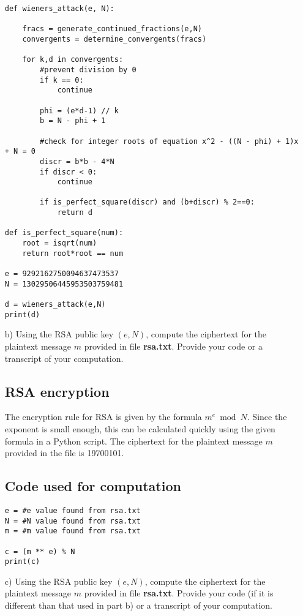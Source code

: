 \documentclass[12pt, letterpaper]{article}
\newcommand{\bgreen}[1]{\textbf{\textcolor{green!50!black}{#1}}}
\begin{document}
\begin{itemize}
\begin{lstlisting}
def wieners_attack(e, N):

    fracs = generate_continued_fractions(e,N)
    convergents = determine_convergents(fracs)

    for k,d in convergents:
        #prevent division by 0
        if k == 0:
            continue

        phi = (e*d-1) // k
        b = N - phi + 1

        #check for integer roots of equation x^2 - ((N - phi) + 1)x + N = 0
        discr = b*b - 4*N
        if discr < 0:
            continue

        if is_perfect_square(discr) and (b+discr) % 2==0:
            return d

def is_perfect_square(num):
    root = isqrt(num)
    return root*root == num

e = 9292162750094637473537
N = 13029506445953503759481

d = wieners_attack(e,N)
print(d)
\end{lstlisting}

\item[b)] Using the RSA public key $(e,N)$, compute the ciphertext for the plaintext message $m$ provided in 
file \bgreen{rsa.txt}.
Provide your code or a transcript of your computation.

\subsection{RSA encryption}
The encryption rule for RSA is given by the formula $m^{e}\bmod N$. Since the exponent is small enough, this can be calculated quickly using the
given formula in a Python script. The ciphertext for the plaintext message $m$ provided in the file is 19700101.\newpage
\subsection{Code used for computation}
\begin{lstlisting}
e = #e value found from rsa.txt
N = #N value found from rsa.txt
m = #m value found from rsa.txt

c = (m ** e) % N
print(c)
\end{lstlisting}

\item[c)] Using the RSA public key $(e,N)$, compute the ciphertext for the plaintext message $m$ provided in 
file \bgreen{rsa.txt}.
Provide your code (if it is different than that used in part b) 
or a transcript of your computation.


\end{itemize}
\end{document}
